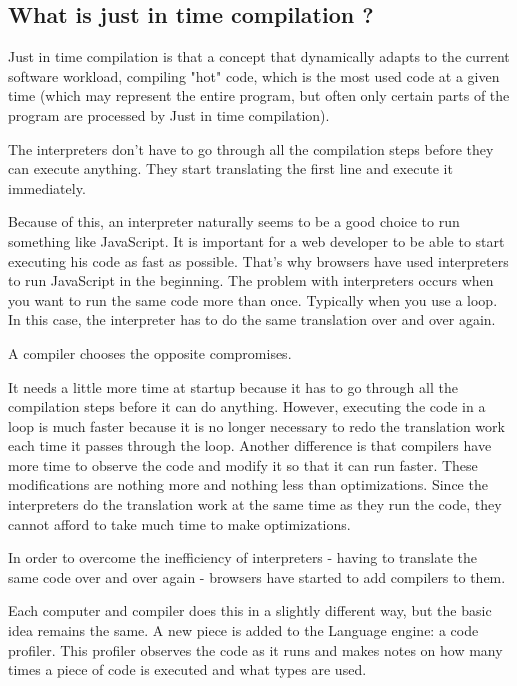 \documentclass{article}
\begin{document}
\subsection{What is just in time compilation ? }

Just in time compilation \cite{aycock2003brief} is that a concept that dynamically adapts to the current software workload, compiling "hot" code, which is the most used code at a given time (which may represent the entire program, but often only certain parts of the program are processed by Just in time compilation).

The interpreters  don't have to go through all the compilation steps before they can execute anything. They start translating the first line and execute it immediately.

Because of this, an interpreter naturally seems to be a good choice to run something like JavaScript. It is important for a web developer to be able to start executing his code as fast as possible. That's why browsers have used interpreters to run JavaScript in the beginning.
The problem with interpreters occurs when you want to run the same code more than once. Typically when you use a loop. In this case, the interpreter has to do the same translation over and over again.

A compiler chooses the opposite compromises.

It needs a little more time at startup because it has to go through all the compilation steps before it can do anything. However, executing the code in a loop is much faster because it is no longer necessary to redo the translation work each time it passes through the loop.
Another difference is that compilers have more time to observe the code and modify it so that it can run faster. These modifications are nothing more and nothing less than optimizations. Since the interpreters do the translation work at the same time as they run the code, they cannot afford to take much time to make optimizations.


In order to overcome the inefficiency of interpreters - having to translate the same code over and over again - browsers have started to add compilers to them.

Each computer and compiler does this in a slightly different way, but the basic idea remains the same. A new piece is added to the Language engine: a code profiler. This profiler observes the code as it runs and makes notes on how many times a piece of code is executed and what types are used.
\end{document}
